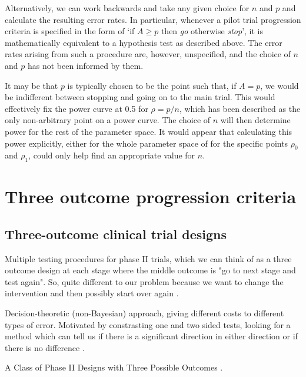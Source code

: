 \documentclass[sagev, Crown]{sagej} %
\begin{document}
Alternatively, we can work backwards and take any given choice for $n$ and $p$ and calculate the resulting error rates. In particular, whenever a pilot trial progression criteria is specified in the form of `if $A \geq p$ then \emph{go} otherwise \emph{stop}', it is mathematically equivalent to a hypothesis test as described above. The error rates arising from such a procedure are, however, unspecified, and the choice of $n$ and $p$ has not been informed by them.

It may be that $p$ is typically chosen to be the point such that, if $A = p$, we would be indifferent between stopping and going on to the main trial. This would effectively fix the power curve at 0.5 for $\rho = p/n$, which has been described as the only non-arbitrary point on a power curve. The choice of $n$ will then determine power for the rest of the parameter space. It would appear that calculating this power explicitly, either for the whole parameter space of for the specific points $\rho_0$ and $\rho_1$, could only help find an appropriate value for $n$.


\section{Three outcome progression criteria}

\subsection{Three-outcome clinical trial designs}

Multiple testing procedures for phase II trials, which we can think of as a three outcome design at each stage where the middle outcome is "go to next stage and test again". So, quite different to our problem because we want to change the intervention and then possibly start over again \cite{Fleming1982}.

Decision-theoretic (non-Bayesian) approach, giving different costs to different types of error. Motivated by constrasting one and two sided tests, looking for a method which can tell us if there is a significant direction in either direction or if there is no difference \cite{Emerson1987}.

A Class of Phase II Designs with Three Possible Outcomes \cite{Storer1992}.
\end{document}
